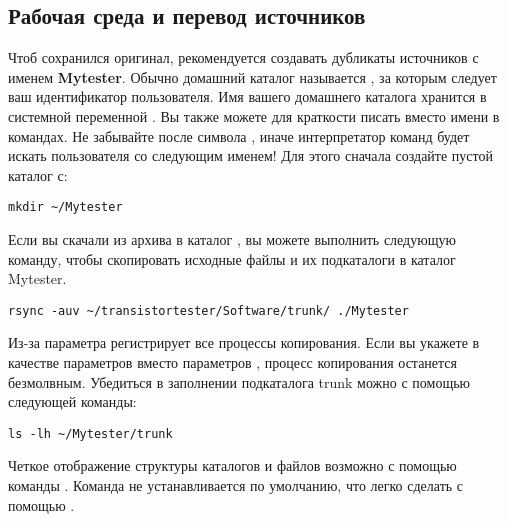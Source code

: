 \subsection{Рабочая среда и перевод источников}
\label{sec:Arbeitsumgebung}
Чтоб сохранился оригинал, рекомендуется создавать дубликаты источников с именем \textbf{Mytester}.
Обычно домашний каталог называется , за которым следует ваш идентификатор пользователя.
Имя вашего домашнего каталога хранится в системной переменной .
Вы также можете для краткости писать \lname{\textasciitilde/} вместо имени в командах.
Не забывайте \lname {/} после символа \lname{\textasciitilde},
иначе интерпретатор команд будет искать пользователя со следующим именем!
Для этого сначала создайте пустой каталог с:
\begin{large} \vspace{-0.4em} \begin{verbatim}
mkdir ~/Mytester
\end{verbatim} \end{large}
Если вы скачали из архива в каталог ,
вы можете выполнить следующую команду, чтобы скопировать исходные файлы и их подкаталоги в каталог Mytester. 
\begin{large} \vspace{-0.4em} \begin{verbatim}
rsync -auv ~/transistortester/Software/trunk/ ./Mytester
\end{verbatim} \end{large}
Из-за параметра   регистрирует все процессы копирования.
Если вы укажете  в качестве параметров вместо параметров , процесс копирования останется безмолвным.
Убедиться в заполнении подкаталога trunk можно с помощью следующей команды:
\begin{large} \vspace{-0.4em} \begin{verbatim}
ls -lh ~/Mytester/trunk
\end{verbatim} \end{large}
Четкое отображение структуры каталогов и файлов возможно с помощью команды .
Команда не устанавливается по умолчанию, что легко сделать с помощью . \\

